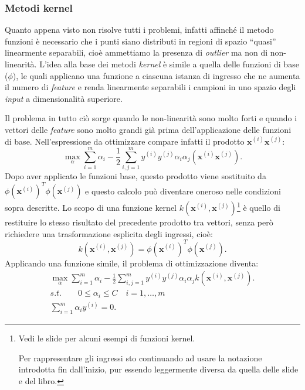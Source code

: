 \subsubsection{Metodi kernel}
Quanto appena visto non risolve tutti i problemi, infatti affinché il metodo funzioni è necessario che i punti siano distributi in regioni di spazio ``quasi'' linearmente separabili, cioè ammettiamo la presenza di \emph{outlier} ma non di non-linearità. L'idea alla base dei metodi \emph{kernel} è simile a quella delle funzioni di base ($\phi$), le quali applicano una funzione a ciascuna istanza di ingresso che ne aumenta il numero di \emph{feature} e renda linearmente separabili i campioni in uno spazio degli \emph{input} a dimensionalità superiore. 

Il problema in tutto ciò sorge quando le non-linearità sono molto forti e quando i vettori delle \emph{feature} sono molto grandi già prima dell'applicazione delle funzioni di base. Nell'espressione da ottimizzare compare infatti il prodotto $\mathbf{x}^{(i)} \mathbf{x}^{(j)}$:
\begin{equation*}
\max_\alpha \sum_{i=1}^m \alpha_i - \frac{1}{2} \sum_{i,j=1}^m y^{(i)} y^{(j)} \alpha_i \alpha_j (\mathbf{x}^{(i)} \mathbf{x}^{(j)}).
\end{equation*}
Dopo aver applicato le funzioni base, questo prodotto viene sostituito da $\phi(\mathbf{x}^{(i)})^T\phi(\mathbf{x}^{(j)})$ e questo calcolo può diventare oneroso nelle condizioni sopra descritte. Lo scopo di una funzione kernel $k(\mathbf{x}^{(i)}, \mathbf{x}^{(j)})$\footnote{Vedi le slide per alcuni esempi di funzioni kernel. 

Per rappresentare gli ingressi sto continuando ad usare la notazione introdotta fin dall'inizio, pur essendo leggermente diversa da quella delle slide e del libro.} è quello di restituire lo stesso risultato del precedente prodotto tra vettori, senza però richiedere una trasformazione esplicita degli ingressi, cioè:
\begin{equation*}
k(\mathbf{x}^{(i)}, \mathbf{x}^{(j)}) = \phi(\mathbf{x}^{(i)})^T\phi(\mathbf{x}^{(j)}).
\end{equation*}
Applicando una funzione simile, il problema di ottimizzazione diventa:
\begin{gather*}
\max_\alpha \sum_{i=1}^m \alpha_i - \frac{1}{2} \sum_{i,j=1}^m y^{(i)} y^{(j)} \alpha_i \alpha_j k(\mathbf{x}^{(i)},\mathbf{x}^{(j)}). \\
s.t. \qquad 0 \leq \alpha_i \leq C \quad i=1,\dots,m \\
\sum_{i=1}^m \alpha_i y^{(i)}= 0.
\end{gather*}
